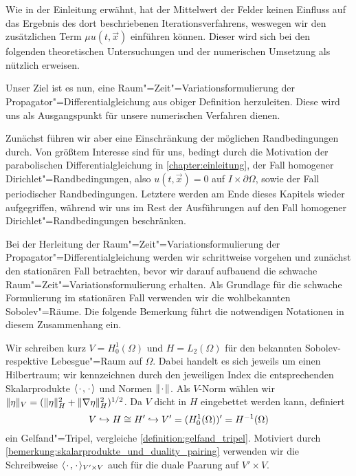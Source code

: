 \documentclass[../main.tex]{subfiles}
\begin{document}
Wie in der Einleitung erwähnt, hat der Mittelwert der Felder keinen Einfluss auf das Ergebnis des dort beschriebenen Iterationsverfahrens, weswegen wir den zusätzlichen Term $\mu u(t, \vec{x})$ einführen können.
Dieser wird sich bei den folgenden theoretischen Untersuchungen und der numerischen Umsetzung als nützlich erweisen.

Unser Ziel ist es nun, eine Raum"=Zeit"=Variationsformulierung der Propagator"=Differentialgleichung aus obiger Definition herzuleiten.
Diese wird uns als Ausgangspunkt für unsere numerischen Verfahren dienen.

Zunächst führen wir aber eine Einschränkung der möglichen Randbedingungen durch.
Von größtem Interesse sind für uns, bedingt durch die Motivation der parabolischen Differentialgleichung in \cref{chapter:einleitung}, der Fall homogener Dirichlet"=Randbedingungen, also $u(t, \vec{x}) = 0$ auf $I \times \partial \Omega$, sowie der Fall periodischer Randbedingungen.
Letztere werden am Ende dieses Kapitels wieder aufgegriffen, während wir uns im Rest der Ausführungen auf den Fall homogener Dirichlet"=Randbedingungen beschränken.

Bei der Herleitung der Raum"=Zeit"=Variationsformulierung der Propagator"=Differentialgleichung werden wir schrittweise vorgehen und zunächst den stationären Fall betrachten, bevor wir darauf aufbauend die schwache Raum"=Zeit"=Variationsformulierung erhalten.
Als Grundlage für die schwache Formulierung im stationären Fall verwenden wir die wohlbekannten Sobolev"=Räume.
Die folgende Bemerkung führt die notwendigen Notationen in diesem Zusammenhang ein.

\begin{Bemerkung}
\label{bemerkung:raeume_und_gelfand_tripel}
    Wir schreiben kurz $V = H^{1}_{0}(\Omega)$ und $H = L_{2}(\Omega)$ für den bekannten Sobolev- respektive Lebesgue"=Raum auf $\Omega$.
    Dabei handelt es sich jeweils um einen Hilbertraum; wir kennzeichnen durch den jeweiligen Index die entsprechenden Skalarprodukte $\langle{\mkern2mu\cdot\mkern2mu},{\mkern2mu\cdot\mkern2mu}\rangle_{}$ und Normen $\lVert{\mkern2mu\cdot\mkern2mu}\rVert$.
    Als $V$-Norm wählen wir $\lVert\eta\rVert_{V} = (\lVert\eta\rVert^{2}_{H} + \lVert\nabla \eta\rVert^{2}_{H})^{1/2}$.
    Da $V$ dicht in $H$ eingebettet werden kann, definiert
    \begin{equation}
        V \hookrightarrow H \cong H' \hookrightarrow V' = (H^{1}_{0}(\Omega))' = H^{-1}(\Omega)
    \end{equation}
    ein Gelfand"=Tripel, vergleiche \cref{definition:gelfand_tripel}.
    Motiviert durch \cref{bemerkung:skalarprodukte_und_duality_pairing} verwenden wir die Schreibweise $\langle{\mkern2mu\cdot\mkern2mu},{\mkern2mu\cdot\mkern2mu}\rangle_{V' \times V}$ auch für die duale Paarung auf $V' \times V$.
\end{Bemerkung}
\end{document}
